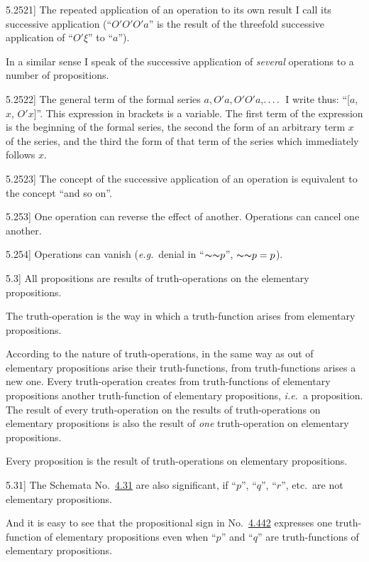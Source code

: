 \documentclass[12pt,oneside]{book}[2007/10/19]
\newcommand{\PropositionE}[2]{%
  \item[\phantomsection\label{PropE:#1}\PropGRef{#1}] #2%
}
\newcommand{\PropERef}[1]{\hyperref[PropE:#1]{#1}}
\newcommand{\PropGRef}[1]{\hyperref[PropG:#1]{#1}}
\newcommand{\DPtypo}[2]{#2}
\newcommand{\Not}[1]{\mathord{\thicksim} #1}
\newcommand{\idEst}{\textit{i.e.}}
\newcommand{\exempliGratia}{\textit{e.g.}}
\newcommand{\fourdots}{\mathinner{\ldotp\ldotp\ldotp\ldotp}}
\begin{document}
\begin{propositions}
\PropositionE{5.2521}
{The repeated application of an operation to
its own result I call its successive application
(``$O' O' O' a$'' is the result of the threefold successive
application of ``$O' \xi$'' to ``$a$'').

In a similar sense I speak of the successive
application of \emph{several} operations to a number of
propositions.}


\PropositionE{5.2522}
{The general term of the formal series $a, O' a,
O' O' a$,\;$\fourdots$\ I write thus: ``[$a$, $x$, $O' x$]''. This
expression in brackets is a variable. The first
term of the expression is the beginning of the
formal series, the second the form of an arbitrary
term $x$ of the series, and the third the form
of that term of the series which immediately
follows $x$.}


\PropositionE{5.2523}
{The concept of the successive application of
an operation is equivalent to the concept ``and
so on''.}


\PropositionE{5.253}
{One operation can reverse the effect of another.
Operations can cancel one another.}


\PropositionE{5.254}
{Operations can vanish (\exempliGratia\ denial in ``$\Not{\Not{p}}$''\DPtypo{.}{,}
$\Not{\Not{p}} = p$).}


\PropositionE{5.3}
{All propositions are results of truth-operations
on the elementary propositions.

The truth-operation is the way in which a
truth-function arises from elementary propositions.

According to the nature of truth-operations,
in the same way as out of elementary propositions
arise their truth-functions, from truth-func\-tions
arises a new one. Every truth-operation
creates from truth-functions of elementary propositions
another truth-func\-tion of elementary
propositions, \idEst\ a proposition. The result of
every truth-operation on the results of truth-op\-er\-a\-tions
on elementary propositions is also
the result of \emph{one} truth-operation on elementary
propositions.

Every proposition is the result of truth-operations
on elementary propositions.}


\PropositionE{5.31}
{The Schemata No.~\PropERef{4.31} are also significant, if
``$p$'', ``$q$'', ``$r$'', etc.\ are not elementary propositions.

And it is easy to see that the propositional
sign in No.~\DPtypo{\PropERef{4.42}}{\PropERef{4.442}} expresses one truth-function of
elementary propositions even when ``$p$'' and
``$q$'' are truth-functions of elementary propositions.}



\end{propositions}
\end{document}
